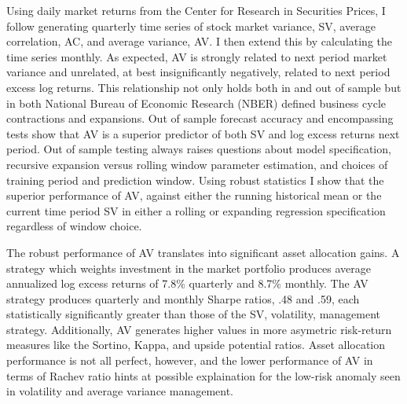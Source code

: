 Using daily market returns from the Center for Research in Securities Prices, I follow \citet{pollet_average_2010} generating quarterly time series of stock market variance, SV, average correlation, AC, and average variance, AV. I then extend this by calculating the time series monthly. As expected, AV is strongly related to next period market variance and unrelated, at best insignificantly negatively, related to next period excess log returns. 
This relationship not only holds both in and out of sample but in both National Bureau of Economic Research (NBER) defined business cycle contractions and expansions. Out of sample forecast accuracy and encompassing tests show that AV is a superior predictor of both SV and log excess returns next period. Out of sample testing always raises questions about model specification, recursive expansion versus rolling window parameter estimation, and choices of training period and prediction window. Using \citet{rossi_out--sample_2012} robust statistics I show that the superior performance of AV, against either the running historical mean or the current time period SV in either a rolling or expanding regression specification regardless of window choice. 

The robust performance of AV translates into significant asset allocation gains. A strategy which weights investment in the market portfolio produces average annualized log excess returns of 7.8\% quarterly and 8.7\% monthly. The AV strategy produces quarterly and monthly Sharpe ratios, .48 and .59, each statistically significantly greater than those of the SV, volatility, management strategy. Additionally, AV generates higher values in more asymetric risk-return measures like the Sortino, Kappa, and upside potential ratios. Asset allocation performance is not all perfect, however, and the lower performance of AV in terms of Rachev ratio hints at possible explaination for the low-risk anomaly seen in volatility and average variance management. 

